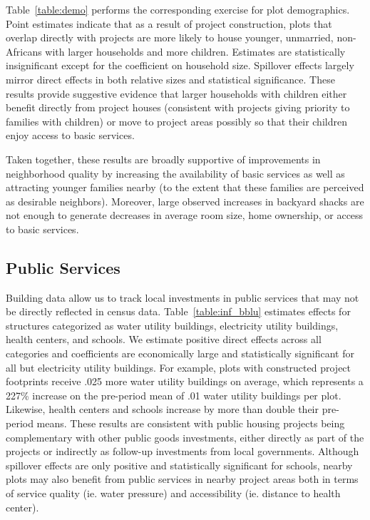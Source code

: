 \documentclass[12pt]{article}
\begin{document}
Table~\ref{table:demo} performs the corresponding exercise for plot demographics.  Point estimates indicate that as a result of project construction, plots that overlap directly with projects are more likely to house younger, unmarried, non-Africans with larger households and more children.  Estimates are statistically insignificant except for the coefficient on household size.  Spillover effects largely mirror direct effects in both relative sizes and statistical significance.  These results provide suggestive evidence that larger households with children either benefit directly from project houses (consistent with projects giving priority to families with children) or move to project areas possibly so that their children enjoy access to basic services.

Taken together, these results are broadly supportive of improvements in neighborhood quality by increasing the availability of basic services as well as attracting younger families nearby (to the extent that these families are perceived as desirable neighbors).  Moreover, large observed increases in backyard shacks are not enough to generate decreases in average room size, home ownership, or access to basic services.


\subsection{Public Services}

Building data allow us to track local investments in public services that may not be directly reflected in census data.  Table~\ref{table:inf_bblu} estimates effects for structures categorized as water utility buildings, electricity utility buildings, health centers, and schools.  We estimate positive direct effects across all categories and coefficients are economically large and statistically significant for all but electricity utility buildings.  For example, plots with constructed project footprints receive .025 more water utility buildings on average, which represents a 227\% increase on the pre-period mean of .01 water utility buildings per plot.  Likewise, health centers and schools increase by more than double their pre-period means.  These results are consistent with public housing projects being complementary with other public goods investments, either directly as part of the projects or indirectly as follow-up investments from local governments.  Although spillover effects are only positive and statistically significant for schools, nearby plots may also benefit from public services in nearby project areas both in terms of service quality (ie. water pressure) and accessibility (ie. distance to health center).  
\end{document}

